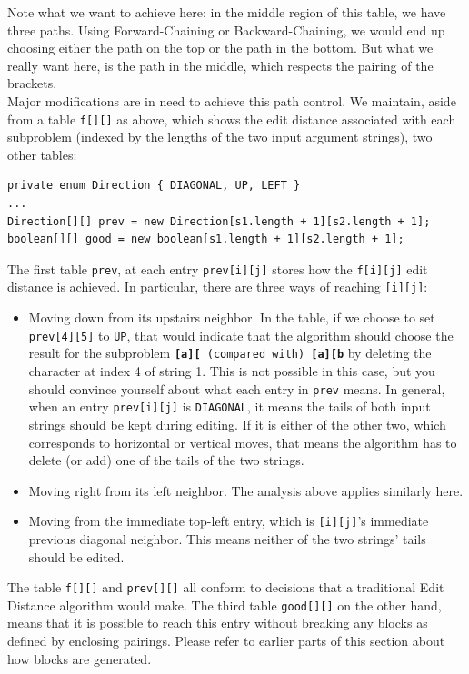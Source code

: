 \documentclass{article}
\begin{document}
Note what we want to achieve here: in the middle region of this table, we have three paths. Using Forward-Chaining or Backward-Chaining, we would end up choosing either the path on the top or the path in the bottom. But what we really want here, is the path in the middle, which respects the pairing of the brackets. \\

Major modifications are in need to achieve this path control. We maintain, aside from a table \texttt{f[][]} as above, which shows the edit distance associated with each subproblem (indexed by the lengths of the two input argument strings), two other tables:
\begin{lstlisting}
private enum Direction { DIAGONAL, UP, LEFT }
...
Direction[][] prev = new Direction[s1.length + 1][s2.length + 1];
boolean[][] good = new boolean[s1.length + 1][s2.length + 1];
\end{lstlisting}
The first table \texttt{prev}, at each entry \texttt{prev[i][j]} stores how the \texttt{f[i][j]} edit distance is achieved. In particular, there are three ways of reaching \texttt{[i][j]}:
\begin{itemize}
  \item Moving down from its upstairs neighbor. In the table, if we choose to set \texttt{prev[4][5]} to \texttt{UP}, that would indicate that the algorithm should choose the result for the subproblem \texttt{\textbf{[a][} (compared with) \textbf{[a][b}} by deleting the character at index 4 of string 1. This is not possible in this case, but you should convince yourself about what each entry in \texttt{prev} means. In general, when an entry \texttt{prev[i][j]} is \texttt{DIAGONAL}, it means the tails of both input strings should be kept during editing. If it is either of the other two, which corresponds to horizontal or vertical moves, that means the algorithm has to delete (or add) one of the tails of the two strings.
  \item Moving right from its left neighbor. The analysis above applies similarly here. 
  \item Moving from the immediate top-left entry, which is \texttt{[i][j]}'s immediate previous diagonal neighbor. This means neither of the two strings' tails should be edited. 
\end{itemize}
The table \texttt{f[][]} and \texttt{prev[][]} all conform to decisions that a traditional Edit Distance algorithm would make. The third table \texttt{good[][]} on the other hand, means that it is possible to reach this entry without breaking any blocks as defined by enclosing pairings. Please refer to earlier parts of this section about how blocks are generated.\\
\end{document}
